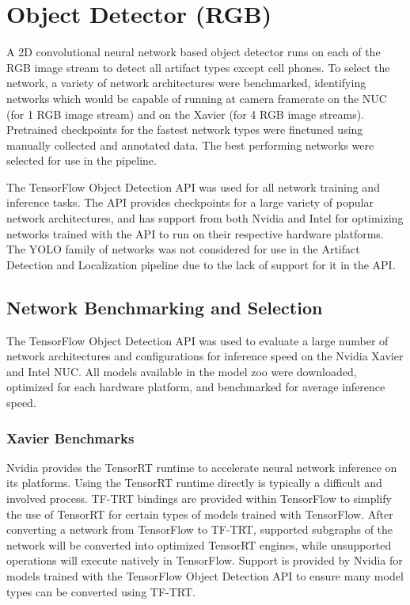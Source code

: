 \section{Object Detector (RGB)}

A 2D convolutional neural network based object detector runs on each of the RGB image stream to detect all artifact types except cell phones. To select the network, a variety of network architectures were benchmarked, identifying networks which would be capable of running at camera framerate on the NUC (for 1 RGB image stream) and on the Xavier (for 4 RGB image streams). Pretrained checkpoints for the fastest network types were finetuned using manually collected and annotated data. The best performing networks were selected for use in the pipeline.

The TensorFlow Object Detection API was used for all network training and inference tasks. The API provides checkpoints for a large variety of popular network architectures, and has support from both Nvidia and Intel for optimizing networks trained with the API to run on their respective hardware platforms. The YOLO family of networks was not considered for use in the Artifact Detection and Localization pipeline due to the lack of support for it in the API.

\subsection{Network Benchmarking and Selection}

The TensorFlow Object Detection API was used to evaluate a large number of network architectures and configurations for inference speed on the Nvidia Xavier and Intel NUC. All models available in the model zoo were downloaded, optimized for each hardware platform, and benchmarked for average inference speed. 

\subsubsection{Xavier Benchmarks}

Nvidia provides the TensorRT runtime to accelerate neural network inference on its platforms. Using the TensorRT runtime directly is typically a difficult and involved process. TF-TRT bindings are provided within TensorFlow to simplify the use of TensorRT for certain types of models trained with TensorFlow. After converting a network from TensorFlow to TF-TRT, supported subgraphs of the network will be converted into optimized TensorRT engines, while unsupported operations will execute natively in TensorFlow. Support is provided by Nvidia for models trained with the TensorFlow Object Detection API to ensure many model types can be converted using TF-TRT. 

